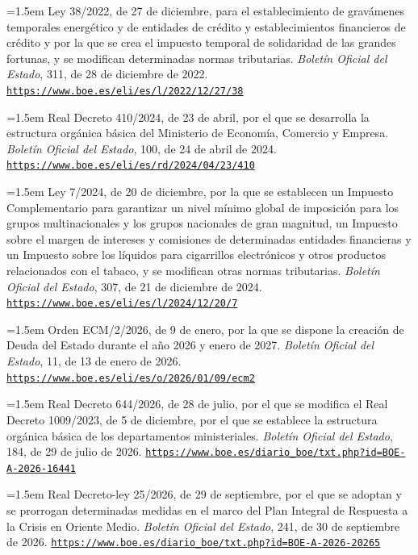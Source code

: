 \documentclass[10pt,a4paper]{article}
\begin{document}
\noindent\hangindent=1.5em Ley 38/2022, de 27 de diciembre, para el establecimiento de gravámenes temporales energético y de entidades de crédito y establecimientos financieros de crédito y por la que se crea el impuesto temporal de solidaridad de las grandes fortunas, y se modifican determinadas normas tributarias. \textit{Boletín Oficial del Estado}, 311, de 28 de diciembre de 2022. \href{https://www.boe.es/eli/es/l/2022/12/27/38}{\nolinkurl{https://www.boe.es/eli/es/l/2022/12/27/38}}

\noindent\hangindent=1.5em Real Decreto 410/2024, de 23 de abril, por el que se desarrolla la estructura orgánica básica del Ministerio de Economía, Comercio y Empresa. \textit{Boletín Oficial del Estado}, 100, de 24 de abril de 2024. \href{https://www.boe.es/eli/es/rd/2024/04/23/410}{\nolinkurl{https://www.boe.es/eli/es/rd/2024/04/23/410}}

\noindent\hangindent=1.5em Ley 7/2024, de 20 de diciembre, por la que se establecen un Impuesto Complementario para garantizar un nivel mínimo global de imposición para los grupos multinacionales y los grupos nacionales de gran magnitud, un Impuesto sobre el margen de intereses y comisiones de determinadas entidades financieras y un Impuesto sobre los líquidos para cigarrillos electrónicos y otros productos relacionados con el tabaco, y se modifican otras normas tributarias. \textit{Boletín Oficial del Estado}, 307, de 21 de diciembre de 2024. \href{https://www.boe.es/eli/es/l/2024/12/20/7}{\nolinkurl{https://www.boe.es/eli/es/l/2024/12/20/7}}

\noindent\hangindent=1.5em Orden ECM/2/2026, de 9 de enero, por la que se dispone la creación de Deuda del Estado durante el año 2026 y enero de 2027. \textit{Boletín Oficial del Estado}, 11, de 13 de enero de 2026. \href{https://www.boe.es/eli/es/o/2026/01/09/ecm2}{\nolinkurl{https://www.boe.es/eli/es/o/2026/01/09/ecm2}}

\noindent\hangindent=1.5em Real Decreto 644/2026, de 28 de julio, por el que se modifica el Real Decreto 1009/2023, de 5 de diciembre, por el que se establece la estructura orgánica básica de los departamentos ministeriales. \textit{Boletín Oficial del Estado}, 184, de 29 de julio de 2026. \href{https://www.boe.es/diario_boe/txt.php?id=BOE-A-2026-16441}{\nolinkurl{https://www.boe.es/diario_boe/txt.php?id=BOE-A-2026-16441}}

\noindent\hangindent=1.5em Real Decreto-ley 25/2026, de 29 de septiembre, por el que se adoptan y se prorrogan determinadas medidas en el marco del Plan Integral de Respuesta a la Crisis en Oriente Medio. \textit{Boletín Oficial del Estado}, 241, de 30 de septiembre de 2026. \href{https://www.boe.es/diario_boe/txt.php?id=BOE-A-2026-20265}{\nolinkurl{https://www.boe.es/diario_boe/txt.php?id=BOE-A-2026-20265}}
\end{document}
